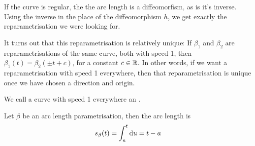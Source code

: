 If the curve is regular, the the arc length is a diffeomorfism, as is it's inverse. Using the inverse in the place of the diffeomorphism $h$, we get exactly the reparametrisation we were looking for.

It turns out that this reparametrisation is relatively unique: If $\beta_1$ and $\beta_2$ are reparametrisations of the same curve, both with speed 1, then $\beta_1(t) = \beta_2(\pm t + c)$, for a constant $c\in\mathbb{R}$. In other words, if we want a reparametrisation with speed 1 everywhere, then that reparametrisation is unique once we have chosen a direction and origin.

\begin{definition}
We call a curve with speed 1 everywhere an .
\end{definition}

Let $\beta$ be an arc length parametrisation, then the arc length is
\[ s_\beta(t) = \int_a^t \operatorname{d \!}{u} = t - a \]

